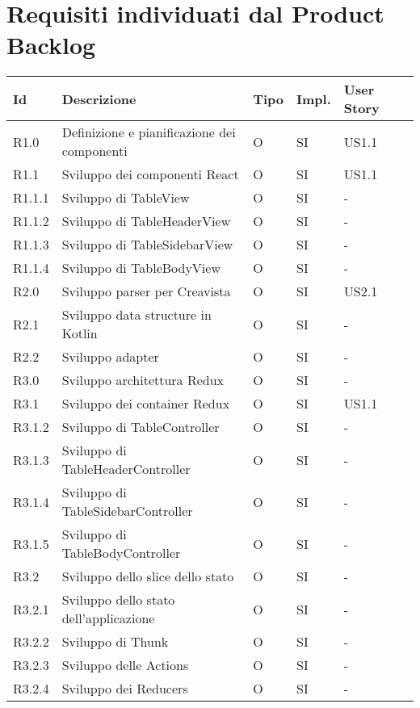 \section{Requisiti individuati dal Product Backlog}
\begin{longtable} {
		|>{}p{10mm}| 
		|>{}p{60mm}|
		|>{}p{15mm}|
		|>{}p{15mm}|
		|>{}p{15mm}|
		>{}p{0mm}}
	\hline
	\textbf{Id} & \textbf{Descrizione} & \textbf{Tipo} & \textbf{Impl.} & \textbf{User Story} \\ \hline
	R1.0   & Definizione e pianificazione dei componenti & O & SI & US1.1\\ \hline
	
	R1.1   & Sviluppo dei componenti React 		  & O & SI & US1.1 \\ \hline
	R1.1.1 & Sviluppo di TableView                & O & SI & -     \\ \hline
	R1.1.2 & Sviluppo di TableHeaderView          & O & SI & -     \\ \hline
	R1.1.3 & Sviluppo di TableSidebarView         & O & SI & -     \\ \hline
	R1.1.4 & Sviluppo di TableBodyView            & O & SI & -     \\ \hline
	
	R2.0   & Sviluppo parser per Creavista     & O & SI & US2.1 \\ \hline
	R2.1   & Sviluppo data structure in Kotlin & O & SI & -     \\ \hline
	R2.2   & Sviluppo adapter                  & O & SI & -     \\ \hline
	
	R3.0   & Sviluppo architettura Redux & O & SI & - \\ \hline
	
	R3.1   & Sviluppo dei container Redux       & O & SI & US1.1 \\ \hline
	R3.1.2 & Sviluppo di TableController        & O & SI & -     \\ \hline
	R3.1.3 & Sviluppo di TableHeaderController  & O & SI & -     \\ \hline
	R3.1.4 & Sviluppo di TableSidebarController & O & SI & -     \\ \hline
	R3.1.5 & Sviluppo di TableBodyController    & O & SI & -     \\ \hline
	
	R3.2   & Sviluppo dello slice dello stato & O & SI & - \\ \hline
	R3.2.1 & Sviluppo dello stato dell'applicazione & O & SI & - \\ \hline
	R3.2.2 & Sviluppo di Thunk & O & SI & - \\ \hline
	R3.2.3 & Sviluppo delle Actions & O & SI & - \\ \hline
	R3.2.4 & Sviluppo dei Reducers & O & SI & - \\ \hline
	

\end{longtable}
